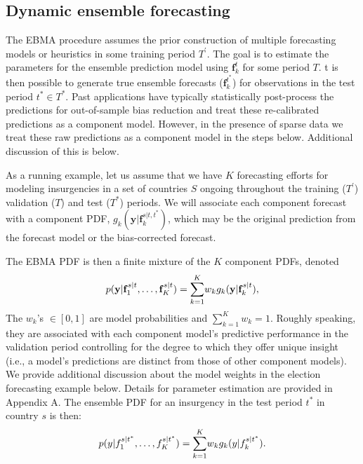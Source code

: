 \documentclass[12pt,fullpage,endnotes]{article}
\begin{document}
\subsection{Dynamic ensemble forecasting}

The EBMA procedure assumes the prior construction of multiple
forecasting models or heuristics in some training period $T^{\prime}$.
The goal is to estimate the parameters for the ensemble prediction
model using $\mathbf{f}^{t}_k$ for some period $T$.  t is then
possible to generate true ensemble forecasts ($\mathbf{f}_k^{t^\ast}$)
for observations in the test period $t^\ast \in T^*$.  Past
applications have typically statistically post-process the predictions
for out-of-sample bias reduction and treat these re-calibrated
predictions as a component model.  However, in the presence of sparse
data we treat these raw predictions as a component model in the steps
below.  Additional discussion of this is below.

As a running example, let us assume that we have $K$ forecasting
efforts for modeling insurgencies in a set of countries $S$ ongoing
throughout the training ($T^{\prime}$) validation ($T$) and test
($T^\ast$) periods.  We will associate each component forecast with a
component PDF, $g_k(\mathbf{y}|\mathbf{f}_k^{s|t, t^\ast})$, which may
be the original prediction from the forecast model or the
bias-corrected forecast.


The EBMA PDF is then a finite mixture of the $K$ component PDFs,
denoted
\begin{equation}
\small
\label{BMA-eq}
p(\mathbf{y}|\mathbf{f}_1^{s|t}, \ldots, \mathbf{f}_K^{s|t})=\overset{K}{\underset{k=1}{\sum}} w_k
g_k(\mathbf{y}|\mathbf{f}_k^{s|t}),
\end{equation}
\noindent The $w_k$'s $\in [0,1]$ are model probabilities and
$\sum_{k=1}^Kw_k=1$.  Roughly speaking, they are associated with each
component model's predictive performance in the validation period
controlling for the degree to which they offer unique insight (i.e.,
a model's predictions are distinct from those of other component models).
We provide additional discussion about the model weights in the
election forecasting example below.  Details for parameter estimation
are provided in Appendix A.  The ensemble PDF for an insurgency in the
test period $t^\ast$ in country $s$ is then:
\begin{equation}
\label{BMA-eq2}
\small
p(y|f_{1}^{s|t^\ast}, \ldots,
f_{K}^{s|t^\ast})=\overset{K}{\underset{k=1}{\sum}} w_k
g_k(y|f_{k}^{s|t^*}).
\end{equation}
\end{document}
